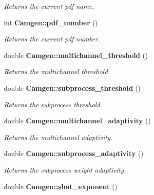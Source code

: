 \begin{DoxyCompactItemize}
\begin{DoxyCompactList}\small\item\em Returns the current pdf name. \end{DoxyCompactList}\item 
\hypertarget{a00849_ab52216341809366c89f47bbc14d608de}{int {\bfseries Camgen\-::pdf\-\_\-number} ()}\label{a00849_ab52216341809366c89f47bbc14d608de}

\begin{DoxyCompactList}\small\item\em Returns the current pdf number. \end{DoxyCompactList}\item 
\hypertarget{a00849_adbd6755bcf0ce4875b7e2724dd95a4d6}{double {\bfseries Camgen\-::multichannel\-\_\-threshold} ()}\label{a00849_adbd6755bcf0ce4875b7e2724dd95a4d6}

\begin{DoxyCompactList}\small\item\em Returns the multichannel threshold. \end{DoxyCompactList}\item 
\hypertarget{a00849_a64845d4544eab34ef9f57ca5489e7d59}{double {\bfseries Camgen\-::subprocess\-\_\-threshold} ()}\label{a00849_a64845d4544eab34ef9f57ca5489e7d59}

\begin{DoxyCompactList}\small\item\em Returns the subprocess threshold. \end{DoxyCompactList}\item 
\hypertarget{a00849_a26b06cbad2fe3a549cf0102ef2605280}{double {\bfseries Camgen\-::multichannel\-\_\-adaptivity} ()}\label{a00849_a26b06cbad2fe3a549cf0102ef2605280}

\begin{DoxyCompactList}\small\item\em Returns the multichannel adaptivity. \end{DoxyCompactList}\item 
\hypertarget{a00849_a736671e9ed27610eab1526c638156c77}{double {\bfseries Camgen\-::subprocess\-\_\-adaptivity} ()}\label{a00849_a736671e9ed27610eab1526c638156c77}

\begin{DoxyCompactList}\small\item\em Returns the subprocess weight adaptivity. \end{DoxyCompactList}\item 
\hypertarget{a00849_ae4a3ebfc64b6591a69a84781aef94f80}{double {\bfseries Camgen\-::shat\-\_\-exponent} ()}\label{a00849_ae4a3ebfc64b6591a69a84781aef94f80}


\end{DoxyCompactItemize}
